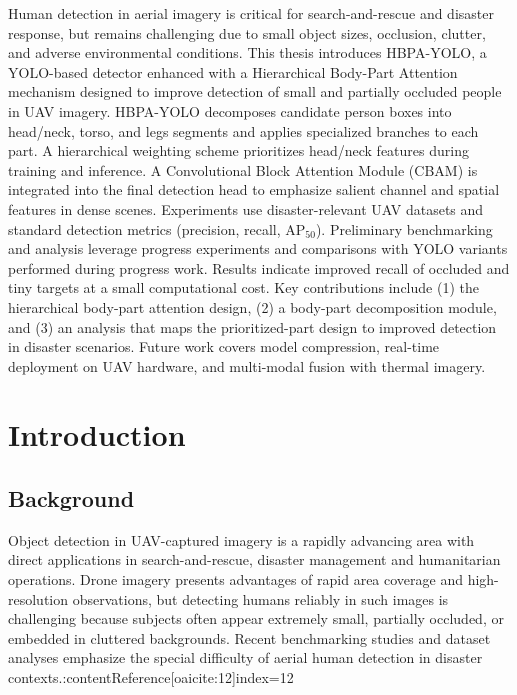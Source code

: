 \documentclass[12pt,a4paper]{report}
\begin{document}
Human detection in aerial imagery is critical for search-and-rescue and disaster response, but remains challenging due to small object sizes, occlusion, clutter, and adverse environmental conditions. This thesis introduces HBPA-YOLO, a YOLO-based detector enhanced with a Hierarchical Body-Part Attention mechanism designed to improve detection of small and partially occluded people in UAV imagery. HBPA-YOLO decomposes candidate person boxes into head/neck, torso, and legs segments and applies specialized branches to each part. A hierarchical weighting scheme prioritizes head/neck features during training and inference. A Convolutional Block Attention Module (CBAM) is integrated into the final detection head to emphasize salient channel and spatial features in dense scenes. Experiments use disaster-relevant UAV datasets and standard detection metrics (precision, recall, AP$_{50}$). Preliminary benchmarking and analysis leverage progress experiments and comparisons with YOLO variants performed during progress work. Results indicate improved recall of occluded and tiny targets at a small computational cost. Key contributions include (1) the hierarchical body-part attention design, (2) a body-part decomposition module, and (3) an analysis that maps the prioritized-part design to improved detection in disaster scenarios. Future work covers model compression, real-time deployment on UAV hardware, and multi-modal fusion with thermal imagery.


\tableofcontents
\listoffigures
\listoftables


\chapter{Introduction}

\section{Background}
Object detection in UAV-captured imagery is a rapidly advancing area with direct applications in search-and-rescue, disaster management and humanitarian operations. Drone imagery presents advantages of rapid area coverage and high-resolution observations, but detecting humans reliably in such images is challenging because subjects often appear extremely small, partially occluded, or embedded in cluttered backgrounds. Recent benchmarking studies and dataset analyses emphasize the special difficulty of aerial human detection in disaster contexts.:contentReference[oaicite:12]{index=12}
\end{document}
